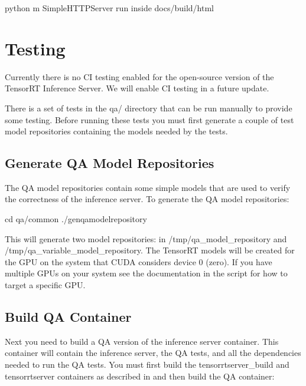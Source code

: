 \documentclass[letterpaper,10pt,english]{sphinxmanual}
\begin{document}
\begin{sphinxVerbatim}[commandchars=\\\{\}]
\PYGZdl{} python \PYGZhy{}m SimpleHTTPServer          \PYGZsh{} run inside docs/build/html
\end{sphinxVerbatim}


\chapter{Testing}
\label{\detokenize{test:testing}}\label{\detokenize{test::doc}}
Currently there is no CI testing enabled for the open-source version
of the TensorRT Inference Server. We will enable CI testing in a
future update.

There is a set of tests in the qa/ directory that can be run manually
to provide some testing. Before running these tests you must first
generate a couple of test model repositories containing the models
needed by the tests.


\section{Generate QA Model Repositories}
\label{\detokenize{test:generate-qa-model-repositories}}
The QA model repositories contain some simple models that are used to
verify the correctness of the inference server. To generate the QA
model repositories:

\begin{sphinxVerbatim}[commandchars=\\\{\}]
\PYGZdl{} cd qa/common
\PYGZdl{} ./gen\PYGZus{}qa\PYGZus{}model\PYGZus{}repository
\end{sphinxVerbatim}

This will generate two model repositories: in /tmp/qa\_model\_repository
and /tmp/qa\_variable\_model\_repository.  The TensorRT models will be
created for the GPU on the system that CUDA considers device 0
(zero). If you have multiple GPUs on your system see the documentation
in the script for how to target a specific GPU.


\section{Build QA Container}
\label{\detokenize{test:build-qa-container}}
Next you need to build a QA version of the inference server
container. This container will contain the inference server, the QA
tests, and all the dependencies needed to run the QA tests. You must
first build the tensorrtserver\_build and tensorrtserver containers as
described in {\hyperref[\detokenize{build:section-building-the-server}]{}} and then build the QA
container:
\end{document}
